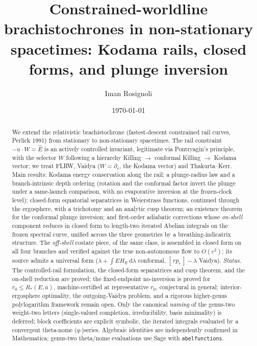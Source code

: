 \documentclass[
    aps, prd, twocolumn, superscriptaddress,
    showpacs, nofootinbib, floatfix
]{revtex4-2}
\newcommand{\Ehat}{\hat E}
\newcommand{\dd}{\mathrm{d}}
\begin{document}
\title{Constrained-worldline brachistochrones in non-stationary
spacetimes: Kodama rails, closed forms, and plunge inversion}

\author{Iman Rosignoli}

\date{\today}

\begin{abstract}
We extend the relativistic brachistochrone (fastest-descent constrained rail
curves, Perlick 1991) from stationary to non-stationary spacetimes. The rail
constraint $-u\cdot W=\Ehat$ is an actively controlled invariant, legitimate via
Pontryagin's principle, with the selector $W$ following a hierarchy Killing $\to$
conformal Killing $\to$ Kodama vector; we treat FLRW, Vaidya ($W=\partial_v$, the
Kodama vector) and Thakurta--Kerr. Main results: Kodama energy conservation along
the rail; a plunge-radius law and a branch-intrinsic depth ordering (rotation and
the conformal factor invert the plunge under a same-launch comparison, with no
evaporative inversion at the frozen-clock level); closed-form equatorial
separatrices in Weierstrass functions, continued through the ergosphere, with a
trichotomy and an analytic cusp theorem; an existence theorem for the conformal
plunge inversion; and first-order adiabatic corrections whose \emph{on-shell}
component reduces in closed form to length-two iterated Abelian integrals on the
frozen spectral curve, unified across the three geometries by a breathing-indicatrix
structure. The \emph{off-shell} costate piece, of the same class, is assembled in
closed form on all four branches and verified against the true non-autonomous flow
to $O(\varepsilon^2)$; its source admits a universal form
($\lambda+\int E H_E\,\dd\lambda$ conformal, $[\,rp_r\,]-\lambda$ Vaidya).
\emph{Status.} The controlled-rail formulation, the closed-form separatrices and
cusp theorem, and the on-shell reduction are proved; the fixed-endpoint no-inversion
is proved for $r_0\le R_\ast(E,a)$, machine-certified at representative $r_0$,
conjectural in general; interior-ergosphere optimality, the outgoing-Vaidya problem,
and a rigorous higher-genus polylogarithm framework remain open. Only the canonical
\emph{naming} of the genus-two weight-two letters (single-valued completion,
irreducibility, basis minimality) is deferred; block coefficients are explicit
symbolic, the iterated integrals evaluated by a convergent theta-nome ($q$-)series.
Algebraic identities are independently confirmed in Mathematica; genus-two
theta/nome evaluations use Sage with \texttt{abelfunctions}.
\end{abstract}
\end{document}
